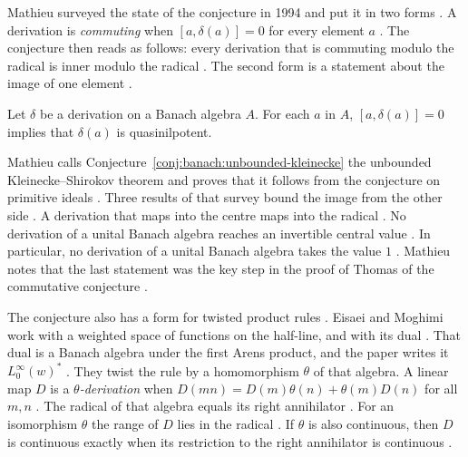 Mathieu surveyed the state of the conjecture in 1994 and put it in two forms
\cite[p.~238]{Mathieu1994Image}. A derivation is \emph{commuting} when
$[a,\delta(a)]=0$ for every element $a$ \cite[p.~238]{Mathieu1994Image}. The
conjecture then reads as follows: every derivation that is commuting modulo
the radical is inner modulo the radical \cite[Conjecture~1,
p.~238]{Mathieu1994Image}. The second form is a statement about the image of
one element \cite[p.~242]{Mathieu1994Image}.

\begin{conjecture}\label{conj:banach:unbounded-kleinecke}
Let $\delta$ be a derivation on a Banach algebra $A$. For each $a$ in $A$,
$[a,\delta(a)]=0$ implies that $\delta(a)$ is quasinilpotent.
\end{conjecture}

Mathieu calls Conjecture~\ref{conj:banach:unbounded-kleinecke} the unbounded
Kleinecke--Shirokov theorem and proves that it follows from the conjecture on
primitive ideals \cite[p.~242]{Mathieu1994Image}. Three results of that survey
bound the image from the other side \cite[pp.~243--245]{Mathieu1994Image}. A
derivation that maps into the centre maps into the radical \cite[Theorem~7,
p.~243]{Mathieu1994Image}. No derivation of a unital Banach algebra reaches an
invertible central value \cite[Theorem~8, p.~245]{Mathieu1994Image}. In
particular, no derivation of a unital Banach algebra takes the value $1$
\cite[Corollary~9, p.~245]{Mathieu1994Image}. Mathieu notes that the last
statement was the key step in the proof of Thomas of the commutative
conjecture \cite[p.~245]{Mathieu1994Image}.

The conjecture also has a form for twisted product rules
\cite[p.~1]{EisaeiMoghimi2024Theta}. Eisaei and Moghimi work with a weighted
space of functions on the half-line, and with its dual
\cite[p.~2]{EisaeiMoghimi2024Theta}. That dual is a Banach algebra under the
first Arens product, and the paper writes it $L^\infty_0(w)^*$
\cite[p.~2]{EisaeiMoghimi2024Theta}. They twist the rule by a homomorphism
$\theta$ of that algebra. A linear map $D$ is a \emph{$\theta$-derivation}
when $D(mn)=D(m)\theta(n)+\theta(m)D(n)$ for all $m,n$
\cite[p.~1]{EisaeiMoghimi2024Theta}. The radical of that algebra equals its
right annihilator \cite[p.~3]{EisaeiMoghimi2024Theta}. For an isomorphism
$\theta$ the range of $D$ lies in the radical \cite[Theorem~2.1,
p.~4]{EisaeiMoghimi2024Theta}. If $\theta$ is also continuous, then $D$ is
continuous exactly when its restriction to the right annihilator is continuous
\cite[Proposition~2.3, p.~5]{EisaeiMoghimi2024Theta}.

